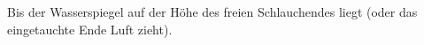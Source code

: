 Bis der Wasserspiegel auf der Höhe des freien Schlauchendes liegt (oder das eingetauchte Ende Luft zieht).
